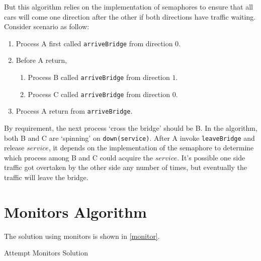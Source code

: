 \documentclass{article}
\begin{document}
But this algorithm relies on the implementation of semaphores to ensure that
all cars will come one direction after the other if both directions have
traffic waiting. Consider scenario as follow:
\begin{enumerate}
    \item Process A first called \verb|arriveBridge| from direction $0$.
    \item Before A return,
        \begin{enumerate}
            \item Process B called \verb|arriveBridge| from direction $1$.
            \item Process C called \verb|arriveBridge| from direction $0$.
        \end{enumerate}
    \item Process A return from \verb|arriveBridge|.
\end{enumerate}
By requirement, the next process `cross the bridge' should be B. In the
algorithm, both B and C are `spinning' on \verb|down(service)|. After A invoke
\verb|leaveBridge| and release $service$, it depends on the implementation of
the semaphore to determine which process among B and C could acquire the
$service$. It's possible one side traffic got overtaken by the other side any
number of times, but eventually the traffic will leave the bridge.

\pagebreak

\section*{Monitors Algorithm}

The solution using monitors is shown in \cref{monitor}.

\begin{algorithm}[H]
\caption{Attempt Monitors Solution}\label{monitor}
\begin{algorithmic}
    \State{}
        \EndIf{}
    \EndFunction{}
    \State{}
            \Else
            \EndIf{}
        \EndIf{}
    \EndFunction{}
\end{algorithmic}
\end{algorithm}
\end{document}
